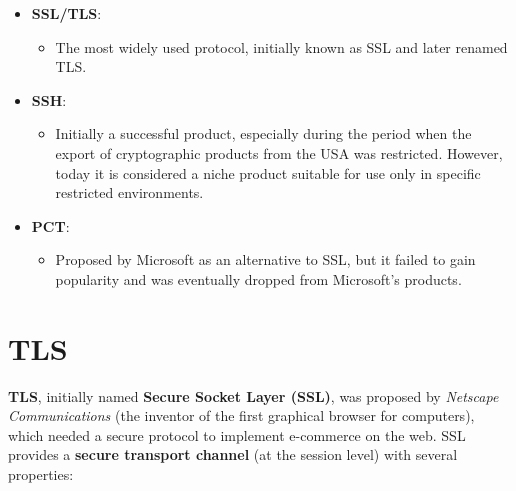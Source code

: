 \begin{itemize}
    \item \textbf{SSL/TLS}:
          \begin{itemize}
              \item The most widely used protocol, initially known as SSL and later renamed TLS.
          \end{itemize}
    \item \textbf{SSH}:
          \begin{itemize}
              \item Initially a successful product, especially during the period when the export of cryptographic products from the USA was restricted. However, today it is considered a niche product suitable for use only in specific restricted environments.
          \end{itemize}
    \item \textbf{PCT}:
          \begin{itemize}
              \item Proposed by Microsoft as an alternative to SSL, but it failed to gain popularity and was eventually dropped from Microsoft's products.
          \end{itemize}
\end{itemize}


\section{TLS}
\textbf{TLS}, initially named \textbf{Secure Socket Layer (SSL)}, was proposed by \textit{Netscape Communications} (the inventor of the first graphical browser for computers), which needed a secure protocol to implement e-commerce on the web. SSL provides a \textbf{secure transport channel} (at the session level) with several properties:

